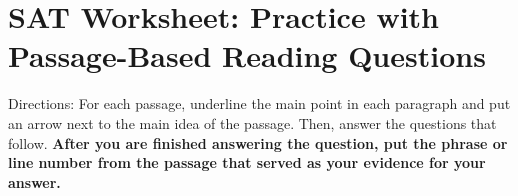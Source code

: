 \section{SAT Worksheet: Practice with Passage-Based Reading Questions}

Directions: For each passage, underline the main point in each paragraph and put an arrow next
to the main idea of the passage. Then, answer the questions that follow. \textbf{After you are finished
answering the question, put the phrase or line number from the passage that served
as your evidence for your answer.}

